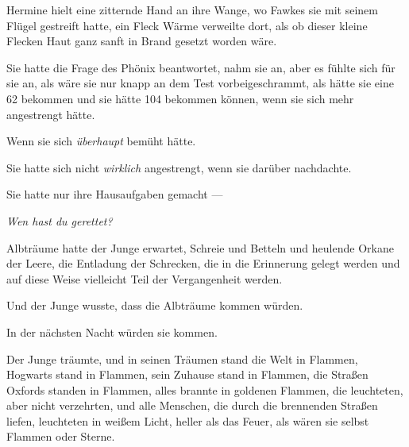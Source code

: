 Hermine hielt eine zitternde Hand an ihre Wange, wo Fawkes sie mit seinem Flügel gestreift hatte, ein Fleck Wärme verweilte dort, als ob dieser kleine Flecken Haut ganz sanft in Brand gesetzt worden wäre.

Sie hatte die Frage des Phönix beantwortet, nahm sie an, aber es fühlte sich für sie an, als wäre sie nur knapp an dem Test vorbeigeschrammt, als hätte sie eine 62 bekommen und sie hätte 104 bekommen können, wenn sie sich mehr angestrengt hätte.

Wenn sie sich \emph{überhaupt} bemüht hätte.

Sie hatte sich nicht \emph{wirklich} angestrengt, wenn sie darüber nachdachte.

Sie hatte nur ihre Hausaufgaben gemacht —

\emph{Wen hast du gerettet?}


Albträume hatte der Junge erwartet, Schreie und Betteln und heulende Orkane der Leere, die Entladung der Schrecken, die in die Erinnerung gelegt werden und auf diese Weise vielleicht Teil der Vergangenheit werden.

Und der Junge wusste, dass die Albträume kommen würden.

In der nächsten Nacht würden sie kommen.

Der Junge träumte, und in seinen Träumen stand die Welt in Flammen, Hogwarts stand in Flammen, sein Zuhause stand in Flammen, die Straßen Oxfords standen in Flammen, alles brannte in goldenen Flammen, die leuchteten, aber nicht verzehrten, und alle Menschen, die durch die brennenden Straßen liefen, leuchteten in weißem Licht, heller als das Feuer, als wären sie selbst Flammen oder Sterne.

